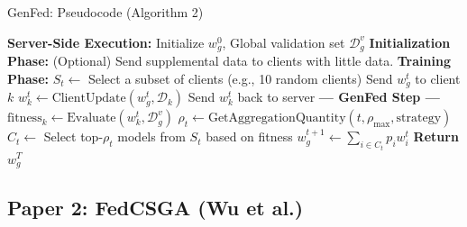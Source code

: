 \documentclass{beamer}
\begin{document}
\begin{frame}[fragile]{GenFed: Pseudocode (Algorithm 2)}
\begin{algorithmic}[1]
\scriptsize
\STATE \textbf{Server-Side Execution:}
\STATE Initialize $w_g^0$, Global validation set $\mathcal{D}_g^v$
\STATE \textbf{Initialization Phase:} (Optional) Send supplemental data to clients with little data.
\STATE \textbf{Training Phase:}
    \STATE $S_t \leftarrow$ Select a subset of clients (e.g., 10 random clients)
        \STATE Send $w_g^t$ to client $k$
        \STATE $w_k^t \leftarrow \text{ClientUpdate}(w_g^t, \mathcal{D}_k)$ 
        \STATE Send $w_k^t$ back to server
    \ENDFOR
    \STATE \textbf{--- GenFed Step ---}
        \STATE $\text{fitness}_k \leftarrow \text{Evaluate}(w_k^t, \mathcal{D}_g^v)$ 
    \ENDFOR
    \STATE $\rho_t \leftarrow \text{GetAggregationQuantity}(t, \rho_{\max}, \text{strategy})$
    \STATE $C_t \leftarrow$ Select top-$\rho_t$ models from $S_t$ based on fitness 
    \STATE $w_g^{t+1} \leftarrow \sum_{i \in C_t} p_i w_i^t$ 
\ENDFOR
\STATE \textbf{Return} $w_g^T$
\end{algorithmic}
\end{frame}

\subsection{Paper 2: FedCSGA (Wu et al.)}
\end{document}
